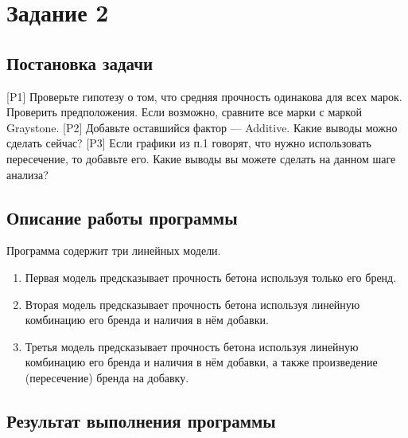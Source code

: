 \documentclass[12pt,a4paper]{article}
\begin{document}
  \newpage
  \section{Задание 2}
  \subsection{Постановка задачи}
  [P1] Проверьте гипотезу о том, что средняя прочность одинакова для всех марок. Проверить предположения. Если возможно, сравните все марки с маркой Graystone.
  [P2] Добавьте оставшийся фактор --- Additive. Какие выводы можно сделать сейчас?
  [P3] Если графики из п.1 говорят, что нужно использовать пересечение, то добавьте его. Какие выводы вы можете сделать на данном шаге анализа?

  \subsection{Описание работы программы}
  Программа содержит три линейных модели.
  \begin{enumerate}
    \item Первая модель предсказывает прочность бетона используя только его бренд.
    \item Вторая модель предсказывает прочность бетона используя линейную комбинацию его бренда и наличия в нём добавки.
    \item Третья модель предсказывает прочность бетона используя линейную комбинацию его бренда и наличия в нём добавки,
      а также произведение (пересечение) бренда на добавку.
  \end{enumerate}

  \subsection{Результат выполнения программы}
\end{document}
